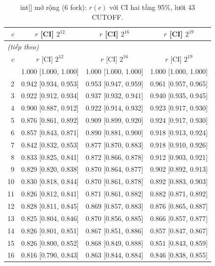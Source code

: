 \footnotesize
\begin{longtable}{rccc}
\caption{int[] mở rộng (6 fork): $r(c)$ với CI hai tầng 95\%, lưới 43 CUTOFF.}\label{tab:int_full}\\
\toprule
$c$ & $r$ [CI] $2^{12}$ & $r$ [CI] $2^{16}$ & $r$ [CI] $2^{19}$ \\
\midrule
\endfirsthead
\multicolumn{4}{l}{\textit{(tiếp theo)}}\\
\toprule
$c$ & $r$ [CI] $2^{12}$ & $r$ [CI] $2^{16}$ & $r$ [CI] $2^{19}$ \\
\midrule
\endhead
\bottomrule
\endlastfoot
1 & 1.000 [1.000, 1.000] & 1.000 [1.000, 1.000] & 1.000 [1.000, 1.000] \\
2 & 0.942 [0.934, 0.953] & 0.953 [0.947, 0.959] & 0.961 [0.957, 0.965] \\
3 & 0.922 [0.912, 0.934] & 0.937 [0.932, 0.941] & 0.940 [0.935, 0.945] \\
4 & 0.900 [0.887, 0.912] & 0.922 [0.914, 0.932] & 0.923 [0.917, 0.930] \\
5 & 0.876 [0.861, 0.892] & 0.909 [0.899, 0.920] & 0.924 [0.917, 0.930] \\
6 & 0.857 [0.843, 0.871] & 0.890 [0.881, 0.900] & 0.918 [0.913, 0.924] \\
7 & 0.842 [0.832, 0.853] & 0.877 [0.870, 0.883] & 0.918 [0.910, 0.926] \\
8 & 0.833 [0.825, 0.841] & 0.872 [0.866, 0.878] & 0.912 [0.903, 0.921] \\
9 & 0.829 [0.820, 0.838] & 0.870 [0.864, 0.877] & 0.902 [0.892, 0.913] \\
10 & 0.830 [0.818, 0.844] & 0.870 [0.861, 0.878] & 0.892 [0.883, 0.903] \\
11 & 0.826 [0.812, 0.841] & 0.871 [0.861, 0.882] & 0.882 [0.871, 0.892] \\
12 & 0.828 [0.811, 0.845] & 0.869 [0.857, 0.883] & 0.876 [0.865, 0.887] \\
13 & 0.825 [0.804, 0.846] & 0.870 [0.856, 0.885] & 0.866 [0.857, 0.877] \\
14 & 0.826 [0.801, 0.851] & 0.867 [0.851, 0.886] & 0.857 [0.847, 0.867] \\
15 & 0.826 [0.800, 0.852] & 0.868 [0.849, 0.888] & 0.851 [0.843, 0.859] \\
16 & 0.816 [0.790, 0.843] & 0.863 [0.844, 0.884] & 0.846 [0.838, 0.855] \\

\end{longtable}
